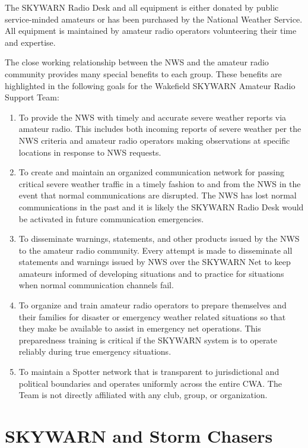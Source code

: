 \documentclass[pdflatex,letterpaper,twoside,12pt]{book}
\begin{document}
The SKYWARN Radio Desk and all equipment is either donated by public service-minded amateurs or has been purchased by the National Weather Service.  All equipment is maintained by amateur radio operators volunteering their time and expertise.

The close working relationship between the NWS and the amateur radio community provides many special benefits to each group. These benefits are highlighted in the following goals for the Wakefield SKYWARN Amateur Radio Support Team:

\begin{enumerate}
\item To provide the NWS with timely and accurate severe weather reports via amateur radio. This includes both incoming reports of severe weather per the NWS criteria and amateur radio operators making observations at specific locations in response to NWS requests.
\item To create and maintain an organized communication network for passing critical severe weather traffic in a timely fashion to and from the NWS in the event that normal communications are disrupted.  The NWS has lost normal communications in the past and it is likely the SKYWARN Radio Desk would be activated in future communication emergencies.
\item To disseminate warnings, statements, and other products issued by the NWS to the amateur radio community.  Every attempt is made to disseminate all statements and warnings issued by NWS over the SKYWARN Net to keep amateurs informed of developing situations and to practice for situations when normal communication channels fail.
\item To organize and train amateur radio operators to prepare themselves and their families for disaster or emergency weather related situations so that they make be available to assist in emergency net operations.  This preparedness training is critical if the SKYWARN system is to operate reliably during true emergency situations.
\item To maintain a Spotter network that is transparent to jurisdictional and political boundaries and operates uniformly across the entire CWA.  The Team is not directly affiliated with any club, group, or organization.
\end{enumerate}


\section{SKYWARN and Storm Chasers}
\end{document}
